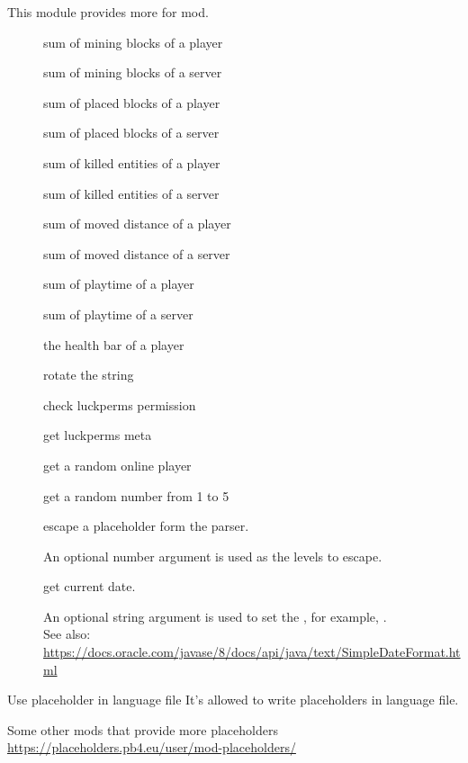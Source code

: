 This module provides more  for  mod.

\begin{description}
    \item [] sum of mining blocks of a player
    \item[] sum of mining blocks of a server
    \item[] sum of placed blocks of a player
    \item[] sum of placed blocks of a server
    \item[] sum of killed entities of a player
    \item[] sum of killed entities of a server
    \item[] sum of moved distance of a player
    \item[] sum of moved distance of a server
    \item[] sum of playtime of a player
    \item[] sum of playtime of a server
    \item[] the health bar of a player
    \item[] rotate the string 
    \item[] check luckperms permission
    \item[] get luckperms meta
    \item[] get a random online player
    \item[] get a random number from 1 to 5
    \item[] {escape a placeholder form the parser.

    An optional number argument is used as the levels to escape.}
    \item[] {get current date.

    An optional string argument is used to set the , for example, .\\
    See also: \url{https://docs.oracle.com/javase/8/docs/api/java/text/SimpleDateFormat.html}}
\end{description}

\begin{tips}{Use placeholder in language file}
    It's allowed to write placeholders in language file.
\end{tips}

\begin{note}{Some other mods that provide more placeholders}
    \url{https://placeholders.pb4.eu/user/mod-placeholders/}
\end{note}



